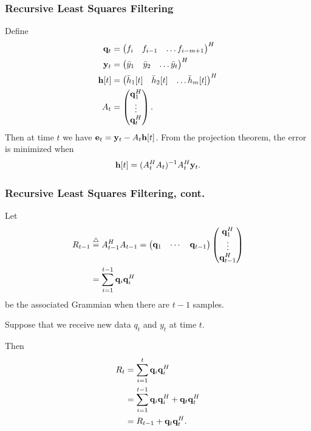 \documentclass{beamer}
\begin{document}
\begin{frame}\frametitle{Recursive Least Squares Filtering}
	Define
	\begin{align*}
		\mathbf{q}_t &= \begin{pmatrix} f_i & f_{i-1} & \dots f_{i-m+1} \end{pmatrix}^H \\
		\mathbf{y}_t &= \begin{pmatrix} \bar{y}_1 & \bar{y}_2 & \dots \bar{y}_t \end{pmatrix}^H \\
		\mathbf{h}[t] &= \begin{pmatrix} \bar{h}_1[t] & \bar{h}_2[t] & \dots \bar{h}_m[t] \end{pmatrix}^H \\
		A_t &= \begin{pmatrix} \mathbf{q}^H_1 \\ \vdots \\ \mathbf{q}^H_t\end{pmatrix}.
	\end{align*}
	Then at time $t$ we have $\mathbf{e}_t = \mathbf{y}_t - A_t \mathbf{h}[t]$.  From the projection theorem, the error is minimized when
	\[
		\mathbf{h}[t] = (A^H_t A_t)^{-1} A_t^H \mathbf{y}_t.
	\]
\end{frame}

\begin{frame}\frametitle{Recursive Least Squares Filtering, cont.}
	Let 
	\begin{align*}
		R_{t-1} &\stackrel{\triangle}{=} A^H_{t-1} A_{t-1} 
		     = \begin{pmatrix}\mathbf{q}_1 & \cdots & \mathbf{q}_{t-1}\end{pmatrix} \begin{pmatrix} \mathbf{q}^H_1 \\ \vdots \\ \mathbf{q}^H_{t-1} \end{pmatrix} \\
		    &= \sum_{i=1}^{t-1} \mathbf{q}_i \mathbf{q}^H_i
	\end{align*}
	be the associated Grammian when there are $t-1$ samples.  
	
	\vfill
	
	Suppose that we receive new data $q_t$ and $y_t$ at time $t$.
	
	\vfill
	
	Then 
	\begin{align*}
		R_t &= \sum_{i=1}^{t} \mathbf{q}_i \mathbf{q}^H_i \\
		    &= \sum_{i=1}^{t-1} \mathbf{q}_i \mathbf{q}^H_i  + \mathbf{q}_t \mathbf{q}_t^H \\
		    &= R_{t-1} + \mathbf{q}_t \mathbf{q}_t^H.
	\end{align*}
\end{frame}
\end{document}
